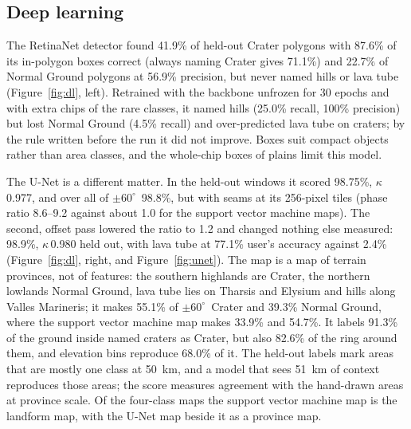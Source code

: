 \documentclass[twocolumn]{aastex701}
\newcommand{\pmsixty}{$\pm60^{\circ}$}
\newcommand{\kap}{$\kappa$}
\begin{document}
\subsection{Deep learning} \label{sec:dl}

The RetinaNet detector found 41.9\% of held-out Crater polygons with 87.6\% of its in-polygon boxes correct (always
naming Crater gives 71.1\%) and 22.7\% of Normal Ground polygons at 56.9\% precision, but never named hills or lava
tube (Figure~\ref{fig:dl}, left). Retrained with the backbone unfrozen for 30 epochs and with extra chips of the rare
classes, it named hills (25.0\% recall, 100\% precision) but lost Normal Ground (4.5\% recall) and over-predicted lava
tube on craters; by the rule written before the run it did not improve. Boxes suit compact objects \citep{Lee2019}
rather than area classes, and the whole-chip boxes of plains limit this model. %

The U-Net is a different matter. In the held-out windows it scored 98.75\%, \kap\,0.977, and over all of \pmsixty\
98.8\%, but with seams at its 256-pixel tiles (phase ratio 8.6--9.2 against about 1.0 for the support vector machine
maps). The second, offset pass lowered the ratio to 1.2 and changed nothing else measured: 98.9\%, \kap\,0.980 held out,
with lava tube at 77.1\% user's accuracy against 2.4\% (Figure~\ref{fig:dl}, right, and Figure~\ref{fig:unet}). The map
is a map of terrain provinces, not of features: the southern highlands are Crater, the northern lowlands Normal Ground,
lava tube lies on Tharsis and Elysium and hills along Valles Marineris; it makes 55.1\% of \pmsixty\ Crater and
39.3\% Normal Ground, where the support vector machine map makes 33.9\% and 54.7\%. It labels 91.3\% of the ground inside named
craters as Crater, but also 82.6\% of the ring around them, and elevation bins reproduce 68.0\% of it. The held-out
labels mark areas that are mostly one class at 50~km, and a model that sees 51~km of context reproduces those areas; the
score measures agreement with the hand-drawn areas at province scale. Of the four-class maps the support vector machine map is
the landform map, with the U-Net map beside it as a province map. %
\end{document}
